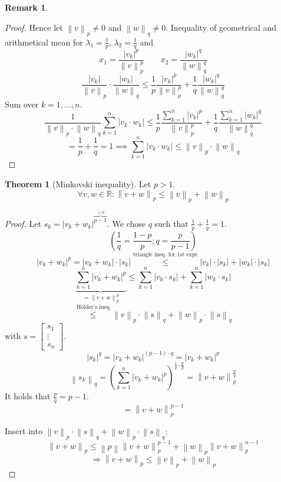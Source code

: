 \documentclass[a4paper,landscape,twocolumn]{article}
\theoremstyle{definition}
\newtheorem{theorem}{Theorem}
\newtheorem{rem}{Remark}
\newcommand\abs[1]{\left|#1\right|}
\newcommand\norm[1]{\left\|#1\right\|}
\begin{document}
\begin{rem}
\begin{enumerate}
\begin{proof}
        Hence let $\norm{v}_p \neq 0$ and $\norm{w}_q \neq 0$.
        Inequality of geometrical and arithmetical mean for $\lambda_1 = \frac1p$, $\lambda_2 = \frac1q$ and
        \[ x_1 = \frac{\abs{v_k}^p}{\norm{v}_p^p} \qquad x_2 = \frac{\abs{w_k}^q}{\norm{w}_q^q} \]
        \[
          \frac{\abs{v_k}}{\norm{v}_p} \cdot \frac{\abs{w_k}}{\norm{w}_q}
          \leq \frac1p \frac{\abs{v_k}^p}{\norm{v}_p^p} + \frac1q \frac{\abs{w_k}^q}{\norm{w}_q^q}
        \]
        Sum over $k = 1, \ldots, n$.
        \[
          \frac{1}{\norm{v}_p \cdot \norm{w}_q} \sum_{k=1}^n \abs{v_k \cdot w_k}
          \leq \frac1p \frac{\sum_{k=1}^n \abs{v_k}^p}{\norm{v}_p^p}
            + \frac1q \frac{\sum_{k=1}^n \abs{w_k}^q}{\norm{w}_q^q}
        \] \[
          = \frac1p + \frac1q = 1
          \implies
          \sum_{k=1}^n \abs{v_k \cdot w_k} \leq \norm{v}_p \cdot \norm{w}_q
        \]
      \end{proof}
      \begin{theorem}[Minkovski inequality]
        Let $p > 1$.
        \[ \forall v, w \in \mathbb R: \norm{v + w}_p \leq \norm{v}_p + \norm{w}_p \]
      \end{theorem}
      \begin{proof}
        Let $s_k = \abs{v_k + w_k}^{\overbrace{p-1}^{>0}}$.
        We chose $q$ such that $\frac1p + \frac1q = 1$.
        \[ \left(\frac1q = \frac{1-p}{p}; q = \frac{p}{p-1}\right) \]
        \[ \abs{v_k + w_k}^p = \abs{v_k + w_k} \cdot \abs{s_k} \overset{\text{triangle ineq. for 1st expr}}{\leq} \abs{v_k} \cdot \abs{s_k} + \abs{w_k} \cdot \abs{s_k} \]
        \[
          \underbrace{\sum_{k=1}^n \abs{v_k + w_k}^p}_{= \norm{v + w}_p^p}
          \leq \sum_{k=1}^n \abs{v_k \cdot s_k} + \sum_{k=1}^n \abs{w_k \cdot s_k}
        \] \[
          \overset{\text{Hölder's ineq}}{\leq}
          \norm{v}_p \cdot \norm{s}_q + \norm{w}_p \cdot \norm{s}_q
        \]
        with $s = \begin{bmatrix} s_1 \\ \vdots \\ s_n \end{bmatrix}$.
        \[ \abs{s_k}^q = \abs{v_k + w_k}^{(p-1) \cdot q} = \abs{v_k + w_k}^p \]
        \[
          \norm{s_k}_q = \left(\sum_{k=1}^n \abs{v_k + w_k}^p\right)^{\frac1q \cdot \frac{p}{p}}
          = \norm{v + w}_p^{\frac{p}{q}}
        \]
        It holds that $\frac{p}{q} = p - 1$.
        \[ = \norm{v + w}_p^{p-1} \]

        Insert into $\norm{v}_p \cdot \norm{s}_q + \norm{w}_p \cdot \norm{s}_q$:
        \[ \norm{v+w}_p \leq \norm{p} \norm{v + w}_p^{p-1} + \norm{w}_p \norm{v + w}_p^{n-1} \]
        \[ \Rightarrow \norm{v + w}_p \leq \norm{v}_p + \norm{w}_p \]
      \end{proof}
  \end{enumerate}
\end{rem}
\end{document}
